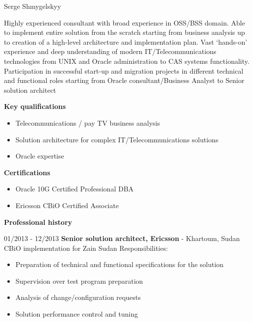 \documentclass[10pt,a4paper]{extbook}
\begin{document}
 
{\Huge \centering Serge Shmygelskyy \par}

Highly experienced consultant with broad experience in OSS/BSS domain. Able to implement entire solution from the scratch starting from business analysis up to creation of a high-level architecture and implementation plan. Vast ‘hands-on’ experience and deep understanding of modern IT/Telecommunications technologies from UNIX and Oracle administration to CAS systems functionality. Participation in successful start-up and migration projects in different technical and functional roles starting from Oracle consultant/Business Analyst to Senior solution architect

{\large \textbf {Key qualifications}}
\singlespacing
\begin{itemize} \itemsep1pt \parskip0pt
\item Telecommunications / pay TV business analysis
\item Solution architecture for complex IT/Telecommunications solutions
\item Oracle expertise
\end{itemize}

{\large \textbf {Certifications}}
\begin{itemize}
\item Oracle 10G Certified Professional DBA
\item Ericsson CBiO Certified Associate 
\end{itemize}

{\large \textbf {Professional history}\par}
01/2013 - 12/2013 \hspace{10mm} \textbf{Senior solution architect, Ericsson} - Khartoum, Sudan \\
CBiO implementation for Zain Sudan
Responsibilities:
\begin{itemize}
	\item Preparation of technical and functional specifications for the solution
	\item Supervision over test program preparation
	\item Analysis of change/configuration requests
	\item Solution performance control and tuning
\end{itemize}
\end{document}
